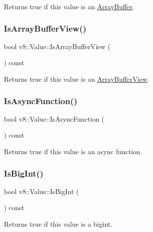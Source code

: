 Returns true if this value is an \mbox{\hyperlink{classv8_1_1ArrayBuffer}{Array\+Buffer}}. \mbox{\label{classv8_1_1Value_ab1ba4b263da3630cf8efd0c6b6e26293}} 
\subsubsection{\texorpdfstring{Is\+Array\+Buffer\+View()}{IsArrayBufferView()}}
{\footnotesize\ttfamily bool v8\+::\+Value\+::\+Is\+Array\+Buffer\+View (\begin{DoxyParamCaption}{ }\end{DoxyParamCaption}) const}

Returns true if this value is an \mbox{\hyperlink{classv8_1_1ArrayBufferView}{Array\+Buffer\+View}}. \mbox{\label{classv8_1_1Value_ade5685814ab387c1772e2d5dbd000735}} 
\subsubsection{\texorpdfstring{Is\+Async\+Function()}{IsAsyncFunction()}}
{\footnotesize\ttfamily bool v8\+::\+Value\+::\+Is\+Async\+Function (\begin{DoxyParamCaption}{ }\end{DoxyParamCaption}) const}

Returns true if this value is an async function. \mbox{\label{classv8_1_1Value_a19fe27cd498d16f014b6f40038ff96ef}} 
\subsubsection{\texorpdfstring{Is\+Big\+Int()}{IsBigInt()}}
{\footnotesize\ttfamily bool v8\+::\+Value\+::\+Is\+Big\+Int (\begin{DoxyParamCaption}{ }\end{DoxyParamCaption}) const}

Returns true if this value is a bigint. \mbox{\label{classv8_1_1Value_a2a4c67e98ddf7b09060e226130f25fda}} 
